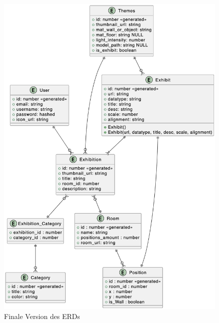 \begin{figure}[h]
\begin{minipage}{0.48\textwidth}
      \includegraphics[width=\textwidth]{pics/lastversion_erd.png}
      \caption{Finale Version des ERDs}
      \label{fig:erd:lastversion}
    \end{minipage}
  \end{figure}









